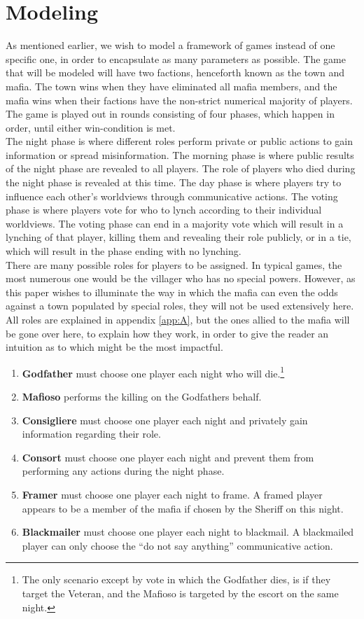 \section{Modeling}
As mentioned earlier, we wish to model a framework of games instead of one
specific one, in order to encapsulate as many parameters as possible. The game
that will be modeled will have two factions, henceforth known as the town and
mafia. The town wins when they have eliminated all mafia members, and the mafia
wins when their factions have the non-strict numerical majority of players. The
game is played out in rounds consisting of four phases, which happen in order,
until either win-condition is met. \\
The night phase is where different roles
perform private or public actions to gain information or spread misinformation.
The morning phase is where public results of the night phase are revealed to
all players. The role of players who died during the night phase is revealed at
this time. The day phase is where players try to influence each other's
worldviews through communicative actions. The voting phase is where players
vote for who to lynch according to their individual worldviews. The voting
phase can end in a majority vote which will result in a lynching of that
player, killing them and revealing their role publicly, or in a tie, which will
result in the phase ending with no lynching. \\
There are many possible roles for 
players to be assigned. In typical games, the most numerous one would be the 
villager who has no special powers. However, as this paper wishes to illuminate 
the way in which the mafia can even the odds against a town populated by 
special roles, they will not be used extensively here. All roles are explained 
in appendix \ref{app:A}, but the ones allied to the mafia will be gone over 
here, to explain how they work, in order to give the reader an intuition as to 
which might be the most impactful.\\ 
\begin{enumerate}
	\item\textbf{Godfather} must choose one player each night who will die.\footnote{The only scenario except by vote in which the Godfather dies, is if they target the Veteran, and the Mafioso is targeted by the escort on the same night.}
	\item\textbf{Mafioso} performs the killing on the Godfathers behalf.
	\item\textbf{Consigliere} must choose one player each night and privately 
	gain information regarding their role. 
	\item\textbf{Consort} must choose one player each night and prevent them 
	from performing any actions during the night phase.
	\item\textbf{Framer} must choose one player each night to frame. A framed 
	player appears to be a member of the mafia if chosen by the Sheriff on this 
	night.
	\item\textbf{Blackmailer} must choose one player each night to blackmail. A 
	blackmailed player can only choose the “do not say anything” communicative 
	action. 
\end{enumerate}

